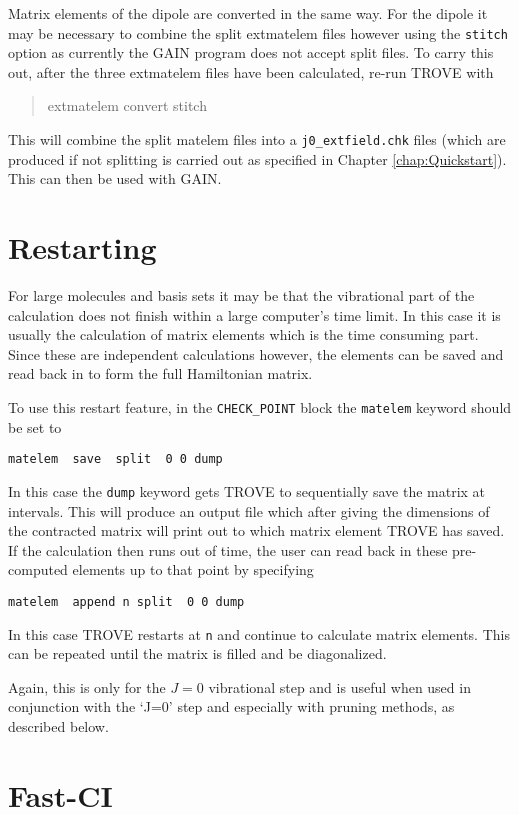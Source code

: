 Matrix elements of the dipole are converted in the same way. For the dipole it may be necessary to combine the split 
extmatelem files however using the \verb|stitch| option as currently the GAIN program does not accept split files.
To carry this out, after the three extmatelem files have been calculated, re-run TROVE with
\begin{verse}
extmatelem convert stitch
\end{verse}
This will combine the split matelem files into a \verb|j0_extfield.chk| files (which are produced if not splitting is 
carried out as specified in Chapter \ref{chap:Quickstart}). This can then be used with GAIN.



\section{Restarting}

For large molecules and basis sets it may be that the vibrational part of the calculation does not finish within a 
large computer's time limit. In this case it is usually the calculation of matrix elements which is the time consuming part.
Since these are independent calculations however, the elements can be saved and read back in to form the full Hamiltonian 
matrix.

To use this restart feature, in the \verb|CHECK_POINT| block the \verb|matelem| keyword should be set to
\begin{verbatim}
matelem  save  split  0 0 dump
\end{verbatim}
In this case the \verb|dump| keyword gets TROVE to sequentially save the matrix at intervals. This will produce an output 
file which after giving the dimensions of the contracted matrix will print out to which matrix element TROVE has saved.
If the calculation then runs out of time, the user can read back in these pre-computed elements up to that point by 
specifying
\begin{verbatim}
matelem  append n split  0 0 dump
\end{verbatim}
In this case TROVE restarts at \verb|n| and continue to calculate matrix elements. This can be repeated until the matrix 
is filled and be diagonalized. 

Again, this is only for the $J=0$ vibrational step and is useful when used in conjunction with the `J=0' step and 
especially with pruning methods, as described below.


\section{Fast-CI}


